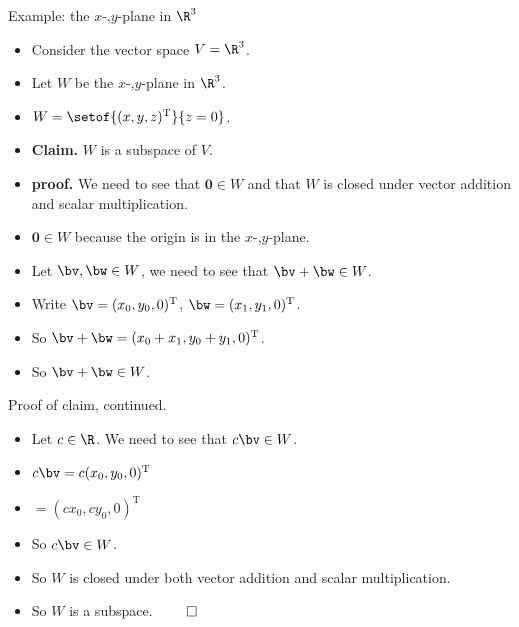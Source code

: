 \documentclass{beamer}
\begin{document}
\begin{frame}{Example: the $x$-,$y$-plane in $\R^3$}

\begin{itemize}
\item Consider the vector space $V = \R^3$.
\item Let $W $ be the $x$-,$y$-plane in $\R^3$.
\item $W = \setof{(x,y,z)^{\text{T}}}{z = 0}$.
\item \textbf{Claim.} $W$ is a subspace of $V$.
\item \textbf{proof.} We need to see that $\textbf{0}\in W$ and that
$W$ is closed under vector
addition and scalar multiplication.
\item $\textbf{0} \in W$ because the origin is in the $x$-,$y$-plane.
\item Let $\bv,\bw\in W$, we need to see that $\bv+\bw\in W$.
\item Write $\bv=(x_0, y_0, 0)^{\text{T}}$, $\bw = (x_1, y_1,0)^{\text{T}}$.
\item So $\bv+\bw = (x_0 + x_1, y_0 + y_1, 0)^{\text{T}}$.
\item So $\bv+\bw \in W$.
\end{itemize}
\end{frame}

\begin{frame}{Proof of claim, continued.}

\begin{itemize}
\item Let $c\in \R$. We need to see that $c \bv\in W$.
\item $c\bv = c(x_0, y_0, 0)^{\text{T}}$
\item $=(cx_0, cy_0, 0)^{\text{T}}$
\item So $c\bv\in W$.
\item So $W$ is closed under both vector addition and scalar multiplication.
\item So $W$ is a subspace. $\qed$
\end{itemize}
\end{frame}
\end{document}
